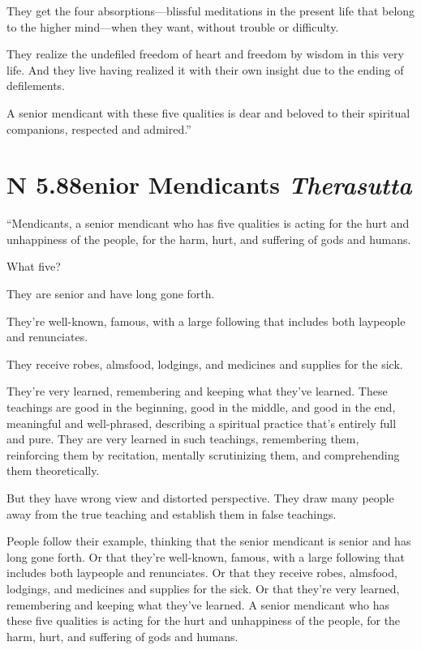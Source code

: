 \documentclass[12pt,openany]{book}%
\newcommand*{\suttatitleacronym}[1]{\smaller[2]{#1}\vspace*{.3em}}
\newcommand*{\suttatitletranslation}[1]{\linebreak{#1}}
\newcommand*{\suttatitleroot}[1]{\linebreak\smaller[2]\itshape{#1}}
\newcommand*{\tocacronym}[1]{\hspace*{-3.3em}{#1}\quad}
\newcommand*{\toctranslation}[1]{#1}
\newcommand*{\tocroot}[1]{(\textit{#1})}
\begin{document}
They get the four absorptions—blissful meditations in the present life that belong to the higher mind—when they want, without trouble or difficulty. 

They realize the undefiled freedom of heart and freedom by wisdom in this very life. And they live having realized it with their own insight due to the ending of defilements. 

A senior mendicant with these five qualities is dear and beloved to their spiritual companions, respected and admired.” 

%
\section*{{\suttatitleacronym AN 5.88}{\suttatitletranslation Senior Mendicants }{\suttatitleroot Therasutta}}
\addcontentsline{toc}{section}{\tocacronym{AN 5.88} \toctranslation{Senior Mendicants } \tocroot{Therasutta}}

“Mendicants, a senior mendicant who has five qualities is acting for the hurt and unhappiness of the people, for the harm, hurt, and suffering of gods and humans. 

What five? 

They are senior and have long gone forth. 

They’re well-known, famous, with a large following that includes both laypeople and renunciates. 

They receive robes, almsfood, lodgings, and medicines and supplies for the sick. 

They’re very learned, remembering and keeping what they’ve learned. These teachings are good in the beginning, good in the middle, and good in the end, meaningful and well-phrased, describing a spiritual practice that’s entirely full and pure. They are very learned in such teachings, remembering them, reinforcing them by recitation, mentally scrutinizing them, and comprehending them theoretically. 

But they have wrong view and distorted perspective. They draw many people away from the true teaching and establish them in false teachings. 

People follow their example, thinking that the senior mendicant is senior and has long gone forth. Or that they’re well-known, famous, with a large following that includes both laypeople and renunciates. Or that they receive robes, almsfood, lodgings, and medicines and supplies for the sick. Or that they’re very learned, remembering and keeping what they’ve learned. A senior mendicant who has these five qualities is acting for the hurt and unhappiness of the people, for the harm, hurt, and suffering of gods and humans. 
\end{document}
